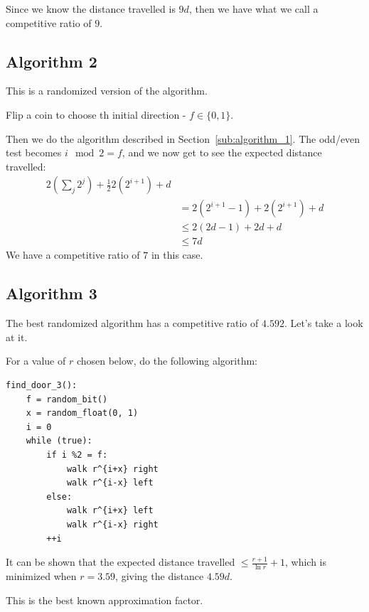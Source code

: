                     Since we know the distance travelled is $9d$, then we have what we call a competitive ratio of $9$.
                \subsection{Algorithm 2} %
                \label{sub:algorithm_2}
                    This is a randomized version of the algorithm.

                    Flip a coin to choose th initial direction - $f \in \{0, 1\}$.

                    Then we do the algorithm described in Section~\ref{sub:algorithm_1}.
                    The odd/even test becomes $i \mod 2 = f$, and we now get to see the expected distance travelled:
                    \begin{align*}
                        2(\sum_j 2^j) + \frac{1}{2} 2(2^{i+1}) + d \\
                        &= 2(2^{i+1} - 1) + 2(2^{i+1}) + d \\
                        &\le 2(2d - 1) + 2d + d \\
                        &\le 7d
                    \end{align*}
                    We have a competitive ratio of $7$ in this case.
                \subsection{Algorithm 3} %
                \label{sub:algorithm_3}
                    The best randomized algorithm has a competitive ratio of $4.592$.
                    Let's take a look at it.

                    For a value of $r$ chosen below, do the following algorithm:
                    \begin{verbatim}
find_door_3():
    f = random_bit()
    x = random_float(0, 1)
    i = 0
    while (true):
        if i %2 = f:
            walk r^{i+x} right
            walk r^{i-x} left
        else:
            walk r^{i+x} left
            walk r^{i-x} right
        ++i
                    \end{verbatim}
                    It can be shown that the expected distance travelled $\le \frac{r+1}{\ln r} + 1$, which is minimized when $r = 3.59$, giving the distance $4.59d$.

                    This is the best known approximation factor.
